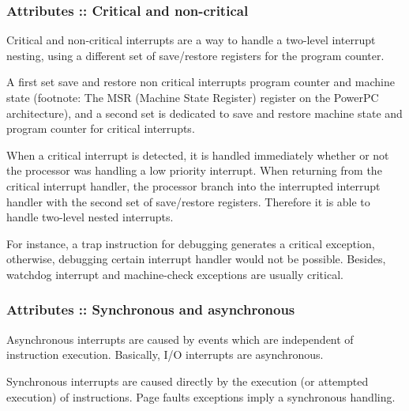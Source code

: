 \begin{frame}
  \frametitle{Attributes :: Critical and non-critical}

Critical and non-critical interrupts are a way to handle a two-level interrupt nesting, using a different set of save/restore registers for the program counter.

\-

 A first set save and restore non critical interrupts program counter and machine state (footnote: The MSR (Machine State Register) register on the PowerPC architecture), and a second set is dedicated to save and restore machine state and program counter for critical interrupts.

\-

When a critical interrupt is detected, it is handled immediately whether or not the processor was handling a low priority interrupt. When returning from the critical interrupt handler, the processor branch into the interrupted interrupt handler with the second set of save/restore registers. Therefore it is able to handle two-level nested interrupts.

\-

For instance, a trap instruction for debugging generates a critical exception, otherwise, debugging certain interrupt handler would not be possible. Besides, watchdog interrupt and machine-check exceptions are usually critical.

\end{frame}


\begin{frame}
  \frametitle{Attributes :: Synchronous and asynchronous}

Asynchronous interrupts are caused by events which are independent of instruction execution. Basically, I/O interrupts are asynchronous.

\-

Synchronous interrupts are caused directly by the execution (or attempted execution) of instructions. Page faults exceptions imply a synchronous handling.

\end{frame}


